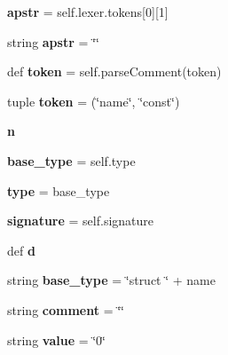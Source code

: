 \begin{DoxyCompactItemize}
{\bfseries apstr} = self.\+lexer.\+tokens\mbox{[}0\mbox{]}\mbox{[}1\mbox{]}
\item 
\mbox{\label{classapibuild_1_1_c_parser_a7012d3e04492d9ce890f8b7dc91c886f}} 
string {\bfseries apstr} = \char`\"{}\char`\"{}
\item 
\mbox{\label{classapibuild_1_1_c_parser_a5adf4239a52252365bdc579fc4502af7}} 
def {\bfseries token} = self.\+parse\+Comment(token)
\item 
\mbox{\label{classapibuild_1_1_c_parser_a9bb99995e0ba09ad499ce2f8f9459ff5}} 
tuple {\bfseries token} = (\char`\"{}name\char`\"{}, \char`\"{}const\char`\"{})
\item 
\mbox{\label{classapibuild_1_1_c_parser_a73009fd086c85061ffcb204a40aedd39}} 
{\bfseries n}
\item 
\mbox{\label{classapibuild_1_1_c_parser_a2872efbe19fa58b292cd49518a0235f2}} 
{\bfseries base\+\_\+type} = self.\+type
\item 
\mbox{\label{classapibuild_1_1_c_parser_a2e6fda17de6ebaf8af494176ea813b19}} 
{\bfseries type} = base\+\_\+type
\item 
\mbox{\label{classapibuild_1_1_c_parser_ae1e05dbc93d17fbe773cdc052ba90c7e}} 
{\bfseries signature} = self.\+signature
\item 
def {\bfseries d}
\item 
\mbox{\label{classapibuild_1_1_c_parser_a71d93acecab29aa34da572403e36b2ef}} 
string {\bfseries base\+\_\+type} = \char`\"{}struct \char`\"{} + name
\item 
\mbox{\label{classapibuild_1_1_c_parser_a030e211614873b22f14af69117a9f8f5}} 
string {\bfseries comment} = \char`\"{}\char`\"{}
\item 
\mbox{\label{classapibuild_1_1_c_parser_abfa5f125319ee47427c995d6daebcc26}} 
string {\bfseries value} = \char`\"{}0\char`\"{}

\end{DoxyCompactItemize}
